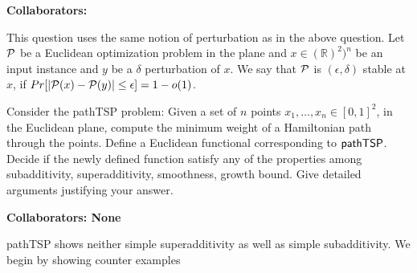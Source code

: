 \documentclass[12pt, a4paper, onecolumn]{exam}
\newcommand{\NP}{\ensuremath{\mathsf{NP}}}
\begin{document}
\begin{questions}
\begin{parts}
		\begin{solution}
			\textbf{Collaborators: }
		\end{solution}

	\end{parts}

	\question[10] This question uses the same notion of perturbation as in the above question.  Let ${\cal P}$ be a Euclidean optimization problem in the plane and $x\in (\mathbb{R})^2)^n$ be an input instance and $y$ be a $\delta$ perturbation of $x$.  We say that ${\cal P}$ is $(\epsilon,\delta)$ stable at $x$, if $Pr[{|\cal P}(x)-{\cal P}(y)| \le \epsilon] = 1-o(1)$.
	
	\question[10] Consider the {\sf pathTSP} problem: Given a set of $n$ points  $x_1,\ldots, x_n \in [0,1]^2$, in the Euclidean plane, compute the minimum weight of a Hamiltonian path through the points.  Define a Euclidean functional corresponding to ${\sf pathTSP}$. Decide if the newly defined function satisfy any of the properties among  subadditivity, superadditivity, smoothness, growth bound. Give detailed arguments justifying your answer.

	\begin{solution}
		\textbf{Collaborators: None}

		\textsf{pathTSP} shows neither simple superadditivity as well as simple subadditivity.
		We begin by showing counter examples


\end{solution}
\end{questions}
\end{document}

